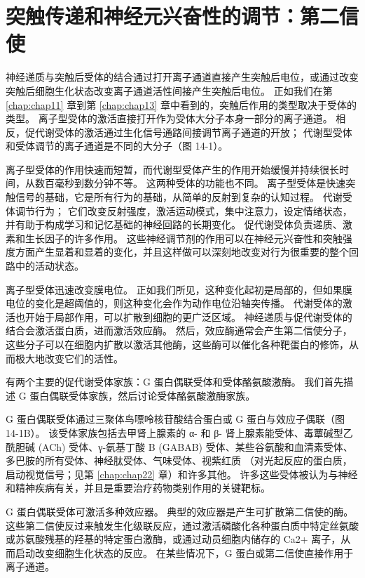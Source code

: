 \chapter{突触传递和神经元兴奋性的调节：第二信使} \label{chap:chap14}
神经递质与突触后受体的结合通过打开离子通道直接产生突触后电位，或通过改变突触后细胞生化状态改变离子通道活性间接产生突触后电位。 
正如我们在第 \ref{chap:chap11} 章到第 \ref{chap:chap13} 章中看到的，突触后作用的类型取决于受体的类型。 
离子型受体的激活直接打开作为受体大分子本身一部分的离子通道。 
相反，促代谢受体的激活通过生化信号通路间接调节离子通道的开放； 
代谢型受体和受体调节的离子通道是不同的大分子（图 14-1）。


离子型受体的作用快速而短暂，而代谢型受体产生的作用开始缓慢并持续很长时间，从数百毫秒到数分钟不等。 
这两种受体的功能也不同。
离子型受体是快速突触信号的基础，它是所有行为的基础，从简单的反射到复杂的认知过程。
代谢受体调节行为；
它们改变反射强度，激活运动模式，集中注意力，设定情绪状态，并有助于构成学习和记忆基础的神经回路的长期变化。
促代谢受体负责递质、激素和生长因子的许多作用。
这些神经调节剂的作用可以在神经元兴奋性和突触强度方面产生显着和显着的变化，并且这样做可以深刻地改变对行为很重要的整个回路中的活动状态。


离子型受体迅速改变膜电位。
正如我们所见，这种变化起初是局部的，但如果膜电位的变化是超阈值的，则这种变化会作为动作电位沿轴突传播。
代谢受体的激活也开始于局部作用，可以扩散到细胞的更广泛区域。
神经递质与促代谢受体的结合会激活蛋白质，进而激活效应酶。
然后，效应酶通常会产生第二信使分子，这些分子可以在细胞内扩散以激活其他酶，这些酶可以催化各种靶蛋白的修饰，从而极大地改变它们的活性。


有两个主要的促代谢受体家族：G 蛋白偶联受体和受体酪氨酸激酶。
我们首先描述 G 蛋白偶联受体家族，然后讨论受体酪氨酸激酶家族。


G 蛋白偶联受体通过三聚体鸟嘌呤核苷酸结合蛋白或 G 蛋白与效应子偶联（图 14-1B）。
该受体家族包括去甲肾上腺素的 α- 和 β- 肾上腺素能受体、毒蕈碱型乙酰胆碱 (ACh) 受体、γ-氨基丁酸 B (GABAB) 受体、某些谷氨酸和血清素受体、多巴胺的所有受体、神经肽受体、气味受体、视紫红质 （对光起反应的蛋白质，启动视觉信号；见第 \ref{chap:chap22} 章）和许多其他。
许多这些受体被认为与神经和精神疾病有关，并且是重要治疗药物类别作用的关键靶标。


G 蛋白偶联受体可激活多种效应器。
典型的效应器是产生可扩散第二信使的酶。
这些第二信使反过来触发生化级联反应，通过激活磷酸化各种蛋白质中特定丝氨酸或苏氨酸残基的羟基的特定蛋白激酶，或通过动员细胞内储存的 Ca2+ 离子，从而启动改变细胞生化状态的反应。
在某些情况下，G 蛋白或第二信使直接作用于离子通道。


